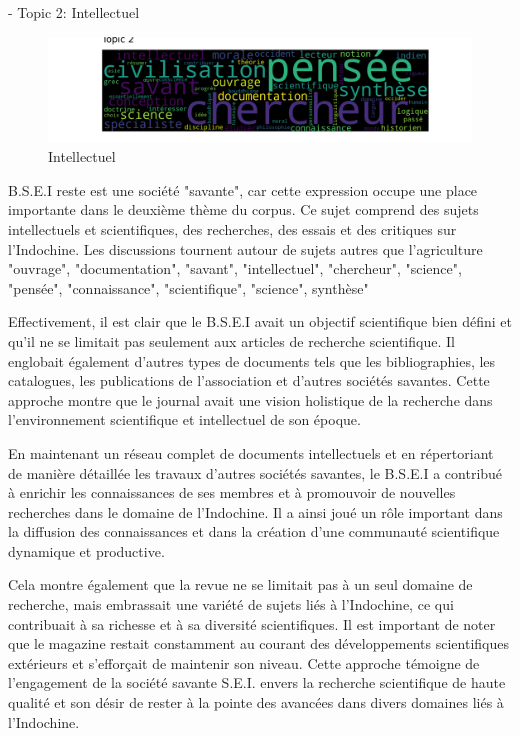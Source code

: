 - Topic 2: Intellectuel
\begin{figure}[H] %
    \centering
    \includegraphics[width=14cm]{img/final_6_topic 2 .png}
    \caption{Intellectuel }
    \label{tp2}
\end{figure}

B.S.E.I reste est une société "savante", car cette expression occupe une place importante dans le deuxième thème du corpus. Ce sujet comprend des sujets intellectuels et scientifiques, des recherches, des essais et des critiques sur l'Indochine. Les discussions tournent autour de sujets autres que l’agriculture
"ouvrage", "documentation", "savant", "intellectuel",  "chercheur", "science", "pensée", "connaissance", "scientifique", "science", synthèse"

Effectivement, il est clair que le B.S.E.I avait un objectif scientifique bien défini et qu'il ne se limitait pas seulement aux articles de recherche scientifique. Il englobait également d'autres types de documents tels que les bibliographies, les catalogues, les publications de l'association et d'autres sociétés savantes. Cette approche montre que le journal avait une vision holistique de la recherche dans l'environnement scientifique et intellectuel de son époque.

En maintenant un réseau complet de documents intellectuels et en répertoriant de manière détaillée les travaux d'autres sociétés savantes, le B.S.E.I a contribué à enrichir les connaissances de ses membres et à promouvoir de nouvelles recherches dans le domaine de l'Indochine. Il a ainsi joué un rôle important dans la diffusion des connaissances et dans la création d'une communauté scientifique dynamique et productive.

Cela montre également que la revue ne se limitait pas à un seul domaine de recherche, mais embrassait une variété de sujets liés à l'Indochine, ce qui contribuait à sa richesse et à sa diversité scientifiques.
Il est important de noter que le magazine restait constamment au courant des développements scientifiques extérieurs et s'efforçait de maintenir son niveau. Cette approche témoigne de l'engagement de la société savante S.E.I. envers la recherche scientifique de haute qualité et son désir de rester à la pointe des avancées dans divers domaines liés à l'Indochine.

